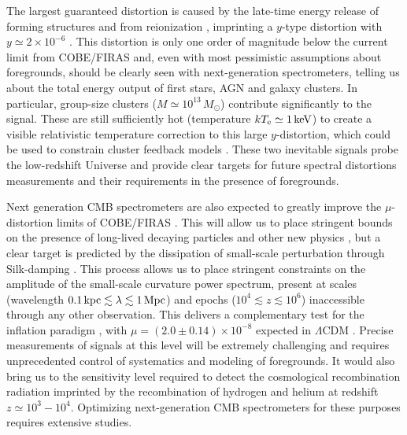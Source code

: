 The largest guaranteed distortion is caused by the late-time energy release of forming structures and from reionization \citep{Sunyaev1972b, Hu1994pert, Oh2003, Cen1999, Refregier2000}, imprinting a $y$-type distortion with $y \simeq 2\times 10^{-6}$ \citep[e.g.,][]{Refregier2000, Hill2015}. This distortion is only one order of magnitude below the current limit from COBE/FIRAS and, even with most pessimistic assumptions about foregrounds, should be clearly seen with next-generation spectrometers, telling us about the total energy output of first stars, AGN and galaxy clusters. In particular, group-size clusters ($M\simeq 10^{13}\,M_{\odot}$) contribute significantly to the signal. These are still sufficiently hot (temperature $k T_{\rm e}\simeq 1\,{\rm keV}$) to create a visible relativistic temperature correction to this large $y$-distortion, which could be used to constrain cluster feedback models \citep{Hill2015}. These two inevitable signals probe the low-redshift Universe and provide clear targets for future spectral distortions measurements and their requirements in the presence of foregrounds.

Next generation CMB spectrometers are also expected to greatly improve the $\mu$-distortion limits of COBE/FIRAS \citep{Kogut2011PIXIE}. This will allow us to place stringent bounds on the presence of long-lived decaying particles \citep{Hu1993b, Chluba2013fore, Chluba2013PCA, Dimastrogiovanni2015} and other new physics \citep[e.g.,][]{Jedamzik2000, Tashiro2012, Dolgov2013, Tashiro2013, Caldwell2013, Yacine2015DM}, but a clear target is predicted by the dissipation of small-scale perturbation through Silk-damping \citep{Sunyaev1970diss, Daly1991, Hu1994, Chluba2012}. This process allows us to place stringent constraints on the amplitude of the small-scale curvature power spectrum, present at scales (wavelength $0.1 \,{\rm kpc} \lesssim \lambda \lesssim 1\, {\rm Mpc}$) and epochs ($10^4 \lesssim z\lesssim 10^6$) inaccessible through any other observation. This delivers a complementary test for the inflation paradigm \citep{Chluba2012inflaton, Dent2012, Chluba2013PCA, Clesse2014, Cabass2016}, with $\mu=(2.0\pm0.14)\times 10^{-8}$ expected in $\Lambda$CDM \citep{Chluba2016LCDM}. Precise measurements of signals at this level will be extremely challenging and requires unprecedented control of systematics and modeling of foregrounds. It would also bring us to the sensitivity level required to detect the cosmological recombination radiation \citep{Sunyaev2009, Chluba2016} imprinted by the recombination of hydrogen and helium at redshift $z\simeq 10^3-10^4$. Optimizing next-generation CMB spectrometers for these purposes requires extensive studies.

